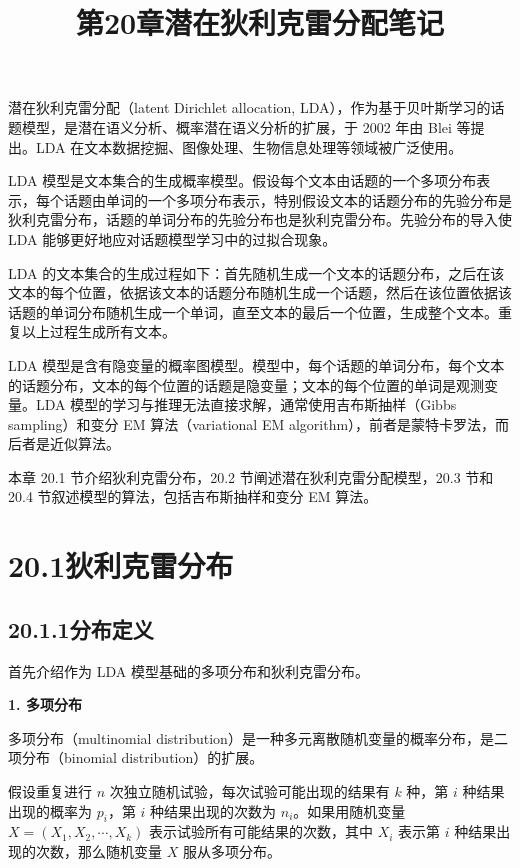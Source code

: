 \documentclass[UTF8,12pt,a4paper,fontset=fandol]{ctexart}
\title{第20章\quad 潜在狄利克雷分配笔记}
\author{}
\date{}
\begin{document}
\maketitle

潜在狄利克雷分配（latent Dirichlet allocation, LDA），作为基于贝叶斯学习的话题模型，是潜在语义分析、概率潜在语义分析的扩展，于 2002 年由 Blei 等提出。LDA 在文本数据挖掘、图像处理、生物信息处理等领域被广泛使用。

LDA 模型是文本集合的生成概率模型。假设每个文本由话题的一个多项分布表示，每个话题由单词的一个多项分布表示，特别假设文本的话题分布的先验分布是狄利克雷分布，话题的单词分布的先验分布也是狄利克雷分布。先验分布的导入使 LDA 能够更好地应对话题模型学习中的过拟合现象。

LDA 的文本集合的生成过程如下：首先随机生成一个文本的话题分布，之后在该文本的每个位置，依据该文本的话题分布随机生成一个话题，然后在该位置依据该话题的单词分布随机生成一个单词，直至文本的最后一个位置，生成整个文本。重复以上过程生成所有文本。

LDA 模型是含有隐变量的概率图模型。模型中，每个话题的单词分布，每个文本的话题分布，文本的每个位置的话题是隐变量；文本的每个位置的单词是观测变量。LDA 模型的学习与推理无法直接求解，通常使用吉布斯抽样（Gibbs sampling）和变分 EM 算法（variational EM algorithm），前者是蒙特卡罗法，而后者是近似算法。

本章 20.1 节介绍狄利克雷分布，20.2 节阐述潜在狄利克雷分配模型，20.3 节和 20.4 节叙述模型的算法，包括吉布斯抽样和变分 EM 算法。

\section*{20.1\quad 狄利克雷分布}

\subsection*{20.1.1\quad 分布定义}

首先介绍作为 LDA 模型基础的多项分布和狄利克雷分布。

\noindent\textbf{1. 多项分布}

多项分布（multinomial distribution）是一种多元离散随机变量的概率分布，是二项分布（binomial distribution）的扩展。

假设重复进行 $n$ 次独立随机试验，每次试验可能出现的结果有 $k$ 种，第 $i$ 种结果出现的概率为 $p_i$，第 $i$ 种结果出现的次数为 $n_i$。如果用随机变量 $X=(X_1,X_2,\cdots,X_k)$ 表示试验所有可能结果的次数，其中 $X_i$ 表示第 $i$ 种结果出现的次数，那么随机变量 $X$ 服从多项分布。
\end{document}
